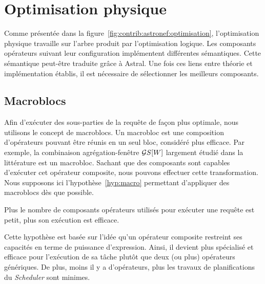 \section{Optimisation physique}\label{sec:contrib:astronef:physique}
Comme présentée dans la figure~\ref{fig:contrib:astronef:optimisation}, l'optimisation physique travaille sur l'arbre produit par l'optimisation logique. Les composants opérateurs suivant leur configuration implémentent différentes sémantiques. Cette sémantique peut-être traduite grâce à Astral. Une fois ces liens entre théorie et implémentation établis, il est nécessaire de sélectionner les meilleurs composants.

\subsection{Macroblocs}
Afin d'exécuter des sous-parties de la requête de façon plus optimale, nous utilisons le concept de macroblocs. Un macrobloc est une composition d'opérateurs pouvant être réunis en un seul bloc, considéré plus efficace. Par exemple, la combinaison agrégation-fenêtre $\mathcal{G} S[W]$ largement étudié dans la littérature est un macrobloc. Sachant que des composants sont capables d'exécuter cet opérateur composite, nous pouvons effectuer cette transformation. Nous supposons ici l'hypothèse~\ref{hyp:macro} permettant d'appliquer des macroblocs dès que possible.
\begin{hyp}\label{hyp:macro}
    Plus le nombre de composants opérateurs utilisés pour exécuter une requête est petit, plus son exécution est efficace.
\end{hyp}

Cette hypothèse est basée sur l'idée qu'un opérateur composite restreint ses capacités en terme de puissance d'expression. Ainsi, il devient plus spécialisé et efficace pour l'exécution de sa tâche plutôt que deux (ou plus) opérateurs génériques. De plus, moins il y a d'opérateurs, plus les travaux de planifications du \textit{Scheduler} sont minimes.

